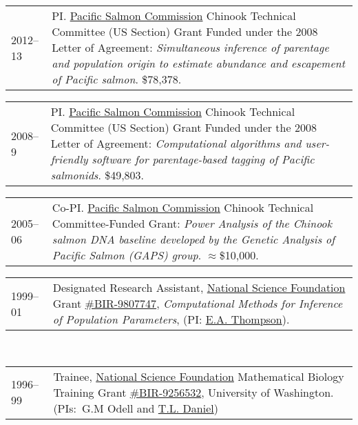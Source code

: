 \documentclass[11pt]{article}
\newlength{\myindent}
\newlength{\scndcol}
\begin{document}
\begin{tabular}{ @{}p{2.5\myindent} p{\scndcol}@{}  }
\hspace*{\myindent}2012--13 &  PI. \href{http://www.psc.org/}{Pacific Salmon Commission} Chinook Technical Committee (US Section) Grant Funded under the 2008 Letter of Agreement: {\em Simultaneous inference of parentage and population origin to estimate abundance and escapement of Pacific salmon}.   \$78,378.\\
\end{tabular}

\begin{tabular}{ @{}p{2.5\myindent} p{\scndcol}@{}  }
\hspace*{\myindent}2008--9 &  PI. \href{http://www.psc.org/}{Pacific Salmon Commission} Chinook Technical Committee (US Section) Grant Funded under the 2008 Letter of Agreement: {\em Computational algorithms and user-friendly software for parentage-based tagging of Pacific salmonids}.   \$49,803.\\
\end{tabular}

\begin{tabular}{ @{}p{2.5\myindent} p{\scndcol}@{}  }
\hspace*{\myindent}2005--06 &  Co-PI. \href{http://www.psc.org/}{Pacific Salmon Commission} Chinook Technical Committee-Funded Grant: {\em Power Analysis of the Chinook salmon DNA baseline developed by the Genetic Analysis of Pacific Salmon (GAPS) group}.  $\approx$\$10,000.  \\
\end{tabular}

\begin{tabular}{ @{}p{2.5\myindent} p{\scndcol}@{}  }
\hspace*{\myindent}1999--01 &  Designated Research Assistant, \href{http://www.nsf.gov/}{National Science Foundation} Grant
\href{http://www.fastlane.nsf.gov/servlet/showaward?award=9807747}{\#BIR-9807747}, {\em Computational Methods for Inference of Population
Parameters}, (PI: \href{http://www.stat.washington.edu/thompson/}{E.A. Thompson}).   \\
\end{tabular}\\
\begin{tabular}{ @{}p{2.5\myindent} p{\scndcol}@{}  }
\hspace*{\myindent}1996--99  &  Trainee, \href{http://www.nsf.gov/}{National Science Foundation}
Mathematical Biology Training Grant \href{http://www.fastlane.nsf.gov/servlet/showaward?award=9256532}{\#BIR-9256532}, University of Washington.  (PIs:~G.M
         Odell and \href{http://faculty.washington.edu/danielt/}{T.L.
         Daniel})\\
\end{tabular}
\end{document}
